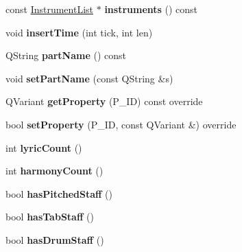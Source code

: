 \begin{DoxyCompactItemize}
const \hyperlink{class_ms_1_1_instrument_list}{Instrument\+List} $\ast$ {\bfseries instruments} () const
\item 
\mbox{\label{class_ms_1_1_part_a96279d100843e980f6ee9121a7ddae89}} 
void {\bfseries insert\+Time} (int tick, int len)
\item 
\mbox{\label{class_ms_1_1_part_ad2391fa561a67958bc07078bd13d9e69}} 
Q\+String {\bfseries part\+Name} () const
\item 
\mbox{\label{class_ms_1_1_part_a511af9d701762c6ebb0093fdbc39be1a}} 
void {\bfseries set\+Part\+Name} (const Q\+String \&s)
\item 
\mbox{\label{class_ms_1_1_part_a9e3e563a452ff2d27142a7057f4fb511}} 
Q\+Variant {\bfseries get\+Property} (P\+\_\+\+ID) const override
\item 
\mbox{\label{class_ms_1_1_part_a89a065e55c379dabc913481b39e95326}} 
bool {\bfseries set\+Property} (P\+\_\+\+ID, const Q\+Variant \&) override
\item 
\mbox{\label{class_ms_1_1_part_a1df140638e7608d4b76eae0289332906}} 
int {\bfseries lyric\+Count} ()
\item 
\mbox{\label{class_ms_1_1_part_adad61af9193f0093e6a309177360d6e8}} 
int {\bfseries harmony\+Count} ()
\item 
\mbox{\label{class_ms_1_1_part_af5da0a0ac0ad1c0a92e132ade37bb758}} 
bool {\bfseries has\+Pitched\+Staff} ()
\item 
\mbox{\label{class_ms_1_1_part_ad1b6e0f5c39fa6dcc041983578772219}} 
bool {\bfseries has\+Tab\+Staff} ()
\item 
\mbox{\label{class_ms_1_1_part_a2cfac8648f151d96abbc2842b5c50d6e}} 
bool {\bfseries has\+Drum\+Staff} ()
\end{DoxyCompactItemize}
